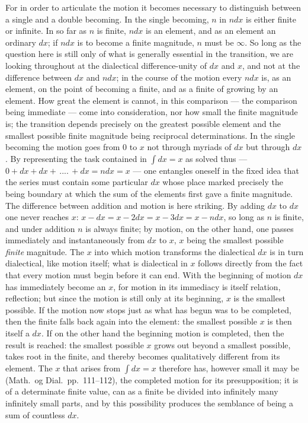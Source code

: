 \documentclass[12pt,a4paper]{book}
\begin{document}
For in order to articulate the motion it becomes necessary to distinguish
between a single and a double becoming. In the single becoming, $n$ in $ndx$ is
either finite or infinite. In so far as $n$ is finite, $ndx$ is an element, and
as an element an ordinary $dx$; if $ndx$ is to become a finite magnitude, $n$
must be $\infty$. So long as the question here is still only of what is
generally essential in the transition, we are looking throughout at the
dialectical difference-unity of $dx$ and $x$, and not at the difference between
$dx$ and $ndx$; in the course of the motion every $ndx$ is, as an element, on
the point of becoming a finite, and as a finite of growing by an element. How
great the element is cannot, in this comparison --- the comparison being
immediate --- come into consideration, nor how small the finite magnitude is;
the transition depends precisely on the greatest possible element and the
smallest possible finite magnitude being reciprocal determinations. In the
single becoming the motion goes from $0$ to $x$ not through myriads of $dx$ but
through $dx$. By representing the task contained in $\int dx = x$ as solved
thus --- $0 + dx + dx +\,....\,+ dx = ndx = x$ --- one entangles oneself in the
fixed idea that the series must contain some particular $dx$ whose place marked
precisely the being boundary at which the sum of the elements first gave a
finite magnitude. The difference between addition and motion is here striking.
By adding $dx$ to $dx$ one never reaches $x$: $x - dx = x - 2dx = x - 3dx = x -
ndx$, so long as $n$ is finite, and under addition $n$ is always finite; by
motion, on the other hand, one passes immediately and instantaneously from $dx$
to $x$, $x$ being the smallest possible \emph{finite} magnitude. The $x$ into
which motion transforms the dialectical $dx$ is in turn dialectical, like
motion itself; what is dialectical in $x$ follows directly from the fact that
every motion must begin before it can end. With the beginning of motion $dx$
has immediately become an $x$, for motion in its immediacy is itself relation,
reflection; but since the motion is still only at its beginning, $x$ is the
smallest possible. If the motion now stops just as what has begun was to be
completed, then the finite falls back again into the element: the smallest
possible $x$ is then itself a $dx$. If on the other hand the beginning motion
is completed, then the result is reached: the smallest
\setcounter{footnote}{0}
possible $x$ grows out beyond a smallest possible, takes root in the finite,
and thereby becomes qualitatively different from its element. The $x$ that
arises from $\int dx = x$ therefore has, however small it may be (Math.\ og
Dial.\ pp.~111--112), the completed motion for its presupposition; it is of a
determinate finite value, can as a finite be divided into infinitely many
infinitely small parts, and by this possibility produces the semblance of being
a sum of countless $dx$.
\end{document}
